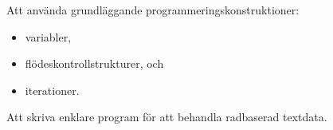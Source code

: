 \item Att använda grundläggande programmeringskonstruktioner:
	\begin{itemize}
		\item variabler,
		\item flödeskontrollstrukturer, och
		\item iterationer.
	\end{itemize}
\item Att skriva enklare program för att behandla radbaserad textdata.
